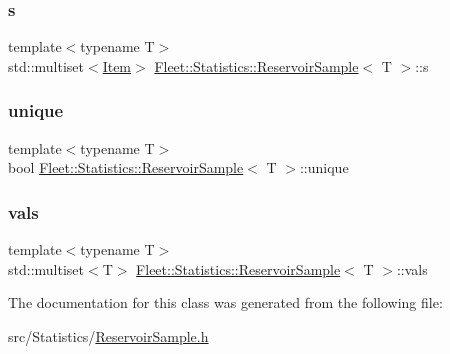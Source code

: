 \subsubsection{\texorpdfstring{s}{s}}
{\footnotesize\ttfamily template$<$typename T$>$ \\
std\+::multiset$<$\hyperlink{class_fleet_1_1_statistics_1_1_reservoir_sample_1_1_item}{Item}$>$ \hyperlink{class_fleet_1_1_statistics_1_1_reservoir_sample}{Fleet\+::\+Statistics\+::\+Reservoir\+Sample}$<$ T $>$\+::s}

\mbox{\label{class_fleet_1_1_statistics_1_1_reservoir_sample_ae3376d7008fd736ff141fa811aad4b65}} 
\subsubsection{\texorpdfstring{unique}{unique}}
{\footnotesize\ttfamily template$<$typename T$>$ \\
bool \hyperlink{class_fleet_1_1_statistics_1_1_reservoir_sample}{Fleet\+::\+Statistics\+::\+Reservoir\+Sample}$<$ T $>$\+::unique}

\mbox{\label{class_fleet_1_1_statistics_1_1_reservoir_sample_a9ffdb177a62651a2280099553124c433}} 
\subsubsection{\texorpdfstring{vals}{vals}}
{\footnotesize\ttfamily template$<$typename T$>$ \\
std\+::multiset$<$T$>$ \hyperlink{class_fleet_1_1_statistics_1_1_reservoir_sample}{Fleet\+::\+Statistics\+::\+Reservoir\+Sample}$<$ T $>$\+::vals}



The documentation for this class was generated from the following file\+:\begin{DoxyCompactItemize}
\item 
src/\+Statistics/\hyperlink{_reservoir_sample_8h}{Reservoir\+Sample.\+h}\end{DoxyCompactItemize}
